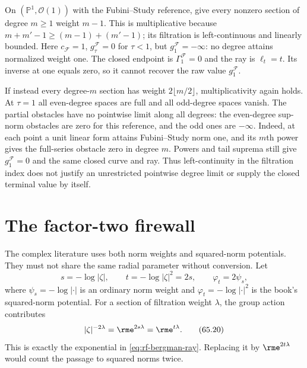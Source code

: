 \begin{example}\label{ex:rf-unattained-filtration-endpoint}
On $(\mathbb P^1,\mathcal O(1))$ with the Fubini--Study reference, give every nonzero section of degree $m\geq1$ weight $m-1$. This is multiplicative because $m+m'-1\geq(m-1)+(m'-1)$; its filtration is left-continuous and linearly bounded. Here $c_{\mathcal F}=1$, $g_\tau^{\mathcal F}=0$ for $\tau<1$, but $g_1^{\mathcal F}=-\infty$: no degree attains normalized weight one. The closed endpoint is $\Gamma_1^{\mathcal F}=0$ and the ray is $\ell_t=t$. Its inverse at one equals zero, so it cannot recover the raw value $g_1^{\mathcal F}$.

If instead every degree-$m$ section has weight $2\lfloor m/2\rfloor$, multiplicativity again holds. At $\tau=1$ all even-degree spaces are full and all odd-degree spaces vanish. The partial obstacles have no pointwise limit along all degrees: the even-degree sup-norm obstacles are zero for this reference, and the odd ones are $-\infty$. Indeed, at each point a unit linear form attains Fubini--Study norm one, and its $m$th power gives the full-series obstacle zero in degree $m$. Powers and tail suprema still give $g_1^{\mathcal F}=0$ and the same closed curve and ray. Thus left-continuity in the filtration index does not justify an unrestricted pointwise degree limit or supply the closed terminal value by itself.
\end{example}

\section{The factor-two firewall}
\label{sec:rf-factor-two-firewall}

The complex literature uses both norm weights and squared-norm potentials.
They must not share the same radial parameter without conversion.  Let
\[
       s=-\log|\zeta|,
       \qquad t=-\log|\zeta|^2=2s,
       \qquad \varphi_t=2\psi_s,
\tag{65.19}\label{eq:rf-factor-two-basic}
\]
where $\psi_s=-\log|\cdot|$ is an ordinary norm weight and
$\varphi_t=-\log|\cdot|^2$ is the book's squared-norm potential.
For a section of filtration weight $\lambda$, the group action contributes
\[
        |\zeta|^{-2\lambda}
             =\rme^{2s\lambda}
             =\rme^{t\lambda}.
\tag{65.20}\label{eq:rf-factor-two-section-weight}
\]
This is exactly the exponential in
\eqref{eq:rf-bergman-ray}.  Replacing it by
$\rme^{2t\lambda}$ would count the passage to squared norms twice.

